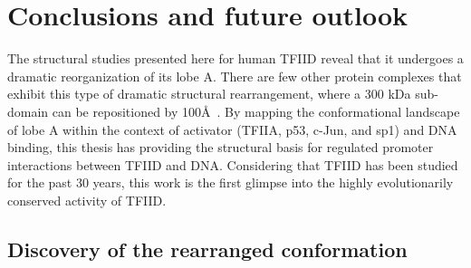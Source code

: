 \chapter{Conclusions and future outlook}

The structural studies presented here for human TFIID reveal that it undergoes a dramatic reorganization of its lobe A. There are few other protein complexes that exhibit this type of dramatic structural rearrangement, where a 300 kDa sub-domain can be repositioned by 100\AA\ . By mapping the conformational landscape of lobe A within the context of activator (TFIIA, p53, c-Jun, and sp1) and DNA binding, this thesis has providing the structural basis for regulated promoter interactions between TFIID and DNA. Considering that TFIID has been studied for the past 30 years, this work is the first glimpse into the highly evolutionarily conserved activity of TFIID. \\     

\section{Discovery of the rearranged conformation}

